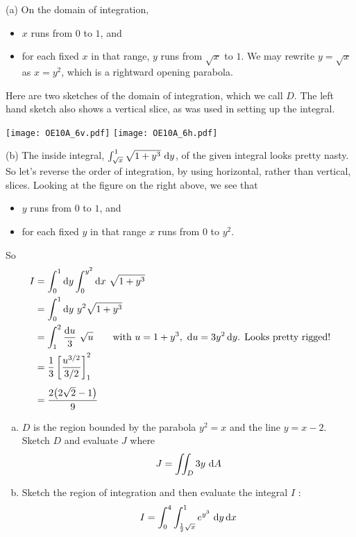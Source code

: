\begin{solution}
(a)
On the domain of integration,
\begin{itemize}
\item
$x$ runs from $0$ to $1$, and
\item
for each fixed $x$ in that range,
$y$ runs from $\sqrt{x}$ to $1$.
We may rewrite $y=\sqrt{x}$ as $x=y^2$, which is a rightward opening
parabola.
\end{itemize}
Here are two sketches of the domain of integration, which we call $D$.
The left hand sketch also shows a vertical slice, as was used in setting up 
the integral.
\begin{center}
     \texttt{[image: OE10A\_6v.pdf]}\qquad
     \texttt{[image: OE10A\_6h.pdf]}
\end{center}

(b) The inside integral, $\int_{\sqrt{x}}^1 \sqrt{1+y^3}\ \mathrm{d}y$,
of the given integral looks pretty nasty. So let's reverse the order of 
integration, by using horizontal, rather than vertical, slices.
Looking at the figure on the right above, we see that
\begin{itemize}
\item
$y$ runs from $0$ to $1$, and
\item
for each fixed $y$ in that range
$x$ runs from $0$ to $y^2$.
\end{itemize}
So
\begin{align*}
I &= \int_0^1\mathrm{d}y \int_0^{y^2}\mathrm{d}x\ \sqrt{1+y^3} \\
&=\int_0^1\mathrm{d}y \ y^2\sqrt{1+y^3} \\
&=\int_1^2\frac{\mathrm{d}u}{3}\ \sqrt{u}
\qquad\text{with $u=1+y^3,\ \mathrm{d}u=3y^2\,\mathrm{d}y$. Looks pretty rigged!} \\
&=\frac{1}{3} \left[\frac{u^{3/2}}{3/2}\right]_1^2 \\[0.05in]
&=\frac{2\big(2\sqrt{2}-1\big)}{9}
\end{align*}
\end{solution}

\begin{question}[M200 2010D] %
\begin{enumerate}[(a)]
\item
$D$ is the region bounded by the parabola $y^2 = x$ and the line $y = x - 2$.
Sketch $D$ and evaluate $J$ where
\begin{equation*}
J = \dblInt_D 3y\ \dee{A}
\end{equation*}
\item
Sketch the region of integration and then evaluate the integral $I$ :
\begin{equation*}
I = \int_0^4  \int_{\frac{1}{2}\sqrt{x}}^1  e^{y^3}\ \dee{y}\,\dee{x}
\end{equation*}
\end{enumerate}
\end{question}

